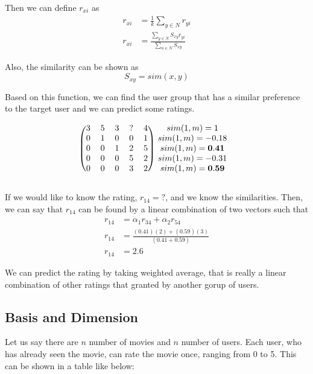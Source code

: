 \documentclass[paper=a4, fontsize=12pt]{scrartcl} %
\numberwithin{equation}{section} %
\numberwithin{figure}{section} %
\numberwithin{table}{section} %
\begin{document}
  Then we can define \(r_{xi}\) as
  \[
    \begin{split}
      r_{xi} & = \frac{1}{k} \sum_{y \in N} r_{yi} \\
      r_{xi} & = \frac{\sum_{y \in N} S_{xy} r_{yi}}{\sum_{u \in N} S_{xy}}
    \end{split}
  \]

  Also, the similarity can be shown as
  \[
    S_{xy} = sim(x,y)
  \]

  Based on this function, we can find the user group that has a similar
  preference to the target user and we can predict some ratings.

  \[
    \begin{blockarray}{cccccc}
      \begin{block}{(ccccc)c}
        3 & 5 & 3 & \mathbf{?} & 4 & sim(1,m) = 1 \\
        0 & 1 & 0 & 0 & 1 & sim(1,m) = -0.18 \\
        0 & 0 & 1 & 2 & 5 & sim(1,m) = \mathbf{0.41} \\
        0 & 0 & 0 & 5 & 2 & sim(1,m) = -0.31 \\
        0 & 0 & 0 & 3 & 2 & sim(1,m) = \mathbf{0.59} \\
      \end{block}
    \end{blockarray}
  \]

  If we would like to know the rating, \(r_{14} = ?\), and we know the
  similarities. Then, we can say that \(r_{14}\) can be found by a linear
  combination of two vectors such that
  \[
    \begin{split}
      r_{14} & = \alpha_1 r_{34} + \alpha_2 r_{54} \\
      r_{14} & = \frac{(0.41)(2) + (0.59)(3)}{(0.41 + 0.59)} \\
      r_{14} & = 2.6
    \end{split}
  \]

  We can predict the rating by taking weighted average, that is really a linear
  combination of other ratings that granted by another gorup of users.

  \subsection{Basis and Dimension}
  
  Let us say there are \(n\) number of movies and \(n\) number of users. Each user, who
  has already seen the movie, can rate the movie once, ranging from 0 to 5. This
  can be shown in a table like below:
\end{document}
